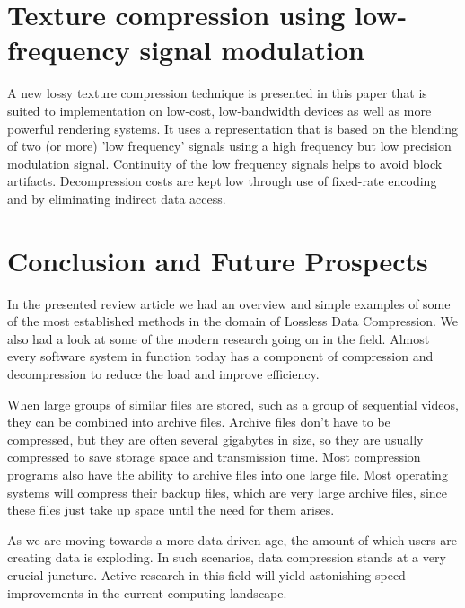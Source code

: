 \documentclass{article}
\begin{document}
\section{Texture compression using low-frequency signal modulation \cite{10.5555/844174.844187}}

A new lossy texture compression technique is presented in this paper that is suited to implementation on low-cost, low-bandwidth devices as well as more powerful rendering systems. It uses a representation that is based on the blending of two (or more) 'low frequency' signals using a high frequency but low precision modulation signal. Continuity of the low frequency signals helps to avoid block artifacts. Decompression costs are kept low through use of fixed-rate encoding and by eliminating indirect data access.


\section{Conclusion and Future Prospects}

In the presented review article we had an overview and simple examples of some of the most established methods in the domain of Lossless Data Compression. We also had a look at some of the modern research going on in the field. Almost every software system in function today has a component of compression and decompression to reduce the load and improve efficiency. 

When large groups of similar files are stored, such as a group of sequential videos, they can be combined into archive files. Archive files don't have to be compressed, but they are often several gigabytes in size, so they are usually compressed to save storage space and transmission time. Most compression programs also have the ability to archive files into one large file. Most operating systems will compress their backup files, which are very large archive files, since these files just take up space until the need for them arises.

As we are moving towards a more data driven age, the amount of which users are creating data is exploding. In such scenarios, data compression stands at a very crucial juncture. Active research in this field will yield astonishing speed improvements in the current computing landscape.

\clearpage



\end{document}
